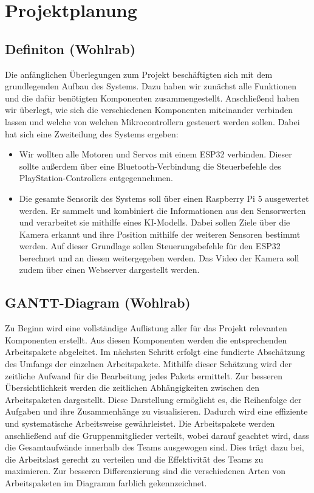 \chapter{Projektplanung}

\section{Definiton (Wohlrab)}

Die anfänglichen Überlegungen zum Projekt beschäftigten sich mit dem grundlegenden Aufbau des Systems.
Dazu haben wir zunächst alle Funktionen und die dafür benötigten Komponenten zusammengestellt.
Anschließend haben wir überlegt, wie sich die verschiedenen Komponenten miteinander verbinden lassen und welche von welchen Mikrocontrollern gesteuert werden sollen.
Dabei hat sich eine Zweiteilung des Systems ergeben: 
\begin{itemize}
    \item Wir wollten alle Motoren und Servos mit einem ESP32 verbinden.
    Dieser sollte außerdem über eine Bluetooth-Verbindung die Steuerbefehle des PlayStation-Controllers entgegennehmen.
    \item Die gesamte Sensorik des Systems soll über einen Raspberry Pi 5 ausgewertet werden.
    Er sammelt und kombiniert die Informationen aus den Sensorwerten und verarbeitet sie mithilfe eines KI-Modells.
    Dabei sollen Ziele über die Kamera erkannt und ihre Position mithilfe der weiteren Sensoren bestimmt werden.
    Auf dieser Grundlage sollen Steuerungsbefehle für den ESP32 berechnet und an diesen weitergegeben werden.
    Das Video der Kamera soll zudem über einen Webserver dargestellt werden.
\end{itemize}

\section{GANTT-Diagram (Wohlrab)}

Zu Beginn wird eine vollständige Auflistung aller für das Projekt relevanten Komponenten erstellt. 
Aus diesen Komponenten werden die entsprechenden Arbeitspakete abgeleitet.
Im nächsten Schritt erfolgt eine fundierte Abschätzung des Umfangs der einzelnen Arbeitspakete. 
Mithilfe dieser Schätzung wird der zeitliche Aufwand für die Bearbeitung jedes Pakets ermittelt.
Zur besseren Übersichtlichkeit werden die zeitlichen Abhängigkeiten zwischen den Arbeitspaketen dargestellt. 
Diese Darstellung ermöglicht es, die Reihenfolge der Aufgaben und ihre Zusammenhänge zu visualisieren. 
Dadurch wird eine effiziente und systematische Arbeitsweise gewährleistet.
Die Arbeitspakete werden anschließend auf die Gruppenmitglieder verteilt, wobei darauf geachtet wird, dass die Gesamtaufwände innerhalb des Teams ausgewogen sind. 
Dies trägt dazu bei, die Arbeitslast gerecht zu verteilen und die Effektivität des Teams zu maximieren.
Zur besseren Differenzierung sind die verschiedenen Arten von Arbeitspaketen im Diagramm farblich gekennzeichnet.

